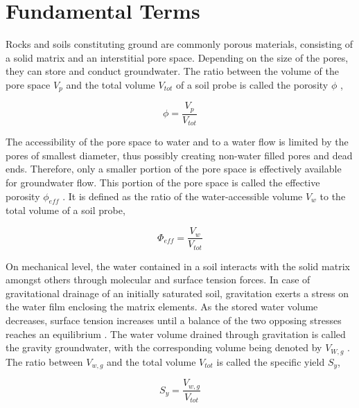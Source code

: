 


\section{Fundamental Terms}
\label{Sec-TheoFundTerms}

Rocks and soils constituting ground are commonly porous materials, consisting of a solid matrix and an interstitial pore space. 
Depending on the size of the pores, they can store and conduct groundwater. 
The ratio between the volume of the pore space $V_p$ and the total volume $V_{tot}$ of a soil probe is called the porosity $\phi$ \parencite{Fetter.2001},

\begin{equation}
    \label{Eq-Porosity}
    \phi = \frac{V_p}{V_{tot}}
\end{equation}

The accessibility of the pore space to water and to a water flow is limited by the pores of smallest diameter, thus possibly creating non-water filled pores and dead ends. 
Therefore, only a smaller portion of the pore space is effectively available for groundwater flow. 
This portion of the pore space is called the effective porosity $\phi_{eff}$ \parencite{Fetter.2001}. 
It is defined as the ratio of the water-accessible volume $V_w$ to the total volume of a soil probe,

\begin{equation}
    \label{Eq-PorEff}
    \Phi_{eff} = \frac{V_w}{V_{tot}}
\end{equation}

On mechanical level, the water contained in a soil interacts with the solid matrix amongst others through molecular and surface tension forces. 
In case of gravitational drainage of an initially saturated soil, gravitation exerts a stress on the water film enclosing the matrix elements. 
As the stored water volume decreases, surface tension increases until a balance of the two opposing stresses reaches an equilibrium \parencite{Fetter.2001}. 
The water volume drained through gravitation is called the gravity groundwater, with the corresponding volume being denoted by $V_{W,g}$ \parencite{Johnson.1967}. 
The ratio between $V_{w,g}$ and the total volume $V_{tot}$ is called the specific yield $S_y$,

\begin{equation}
    \label{Eq-Sy}
    S_y = \frac{V_{w,g}}{V_{tot}}
\end{equation}

